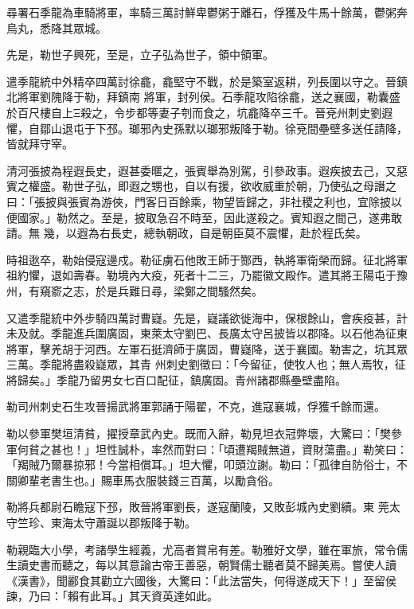 \begin{pinyinscope}
 尋署石季龍為車騎將軍，率騎三萬討鮮卑鬱粥于離石，俘獲及牛馬十餘萬，鬱粥奔烏丸，悉降其眾城。



 先是，勒世子興死，至是，立子弘為世子，領中領軍。



 遣季龍統中外精卒四萬討徐龕，龕堅守不戰，於是築室返耕，列長圍以守之。晉鎮北將軍劉隗降于勒，拜鎮南
 將軍，封列侯。石季龍攻陷徐龕，送之襄國，勒囊盛於百尺樓自上Ξ殺之，令步都等妻子刳而食之，坑龕降卒三千。晉兗州刺史劉遐懼，自鄒山退屯于下邳。瑯邪內史孫默以瑯邪叛降于勒。徐兗間壘壁多送任請降，皆就拜守宰。



 清河張披為程遐長史，遐甚委暱之，張賓舉為別駕，引參政事。遐疾披去己，又惡賓之權盛。勒世子弘，即遐之甥也，自以有援，欲收威重於朝，乃使弘之母譖之曰：「張披與張賓為游俠，門客日百餘乘，物望皆歸之，非社稷之利也，宜除披以便國家。」勒然之。至是，披取急召不時至，因此遂殺之。賓知遐之間己，遂弗敢請。無
 幾，以遐為右長史，總執朝政，自是朝臣莫不震懼，赴於程氏矣。



 時祖逖卒，勒始侵寇邊戍。勒征虜石他敗王師于酂西，執將軍衛榮而歸。征北將軍祖約懼，退如壽春。勒境內大疫，死者十二三，乃罷徽文殿作。遣其將王陽屯于豫州，有窺窬之志，於是兵難日尋，梁鄭之間騷然矣。



 又遣季龍統中外步騎四萬討曹嶷。先是，嶷議欲徙海中，保根餘山，會疾疫甚，計未及就。季龍進兵圍廣固，東萊太守劉巴、長廣太守呂披皆以郡降。以石他為征東將軍，擊羌胡于河西。左軍石挺濟師于廣固，曹嶷降，送于襄國。勒害之，坑其眾三萬。季龍將盡殺嶷眾，其青
 州刺史劉徵曰：「今留征，使牧人也；無人焉牧，征將歸矣。」季龍乃留男女七百口配征，鎮廣固。青州諸郡縣壘壁盡陷。



 勒司州刺史石生攻晉揚武將軍郭誦于陽翟，不克，進寇襄城，俘獲千餘而還。



 勒以參軍樊垣清貧，擢授章武內史。既而入辭，勒見坦衣冠弊壞，大驚曰：「樊參軍何貧之甚也！」坦性誠朴，率然而對曰：「頃遭羯賊無道，資財蕩盡。」勒笑曰：「羯賊乃爾暴掠邪！今當相償耳。」坦大懼，叩頭泣謝。勒曰：「孤律自防俗士，不關卿輩老書生也。」賜車馬衣服裝錢三百萬，以勵貪俗。



 勒將兵都尉石瞻寇下邳，敗晉將軍劉長，遂寇蘭陵，又敗彭城內史劉續。東
 莞太守竺珍、東海太守蕭誕以郡叛降于勒。



 勒親臨大小學，考諸學生經義，尤高者賞帛有差。勒雅好文學，雖在軍旅，常令儒生讀史書而聽之，每以其意論古帝王善惡，朝賢儒士聽者莫不歸美焉。嘗使人讀《漢書》，聞酈食其勸立六國後，大驚曰：「此法當失，何得遂成天下！」至留侯諫，乃曰：「賴有此耳。」其天資英達如此。




\end{pinyinscope}
